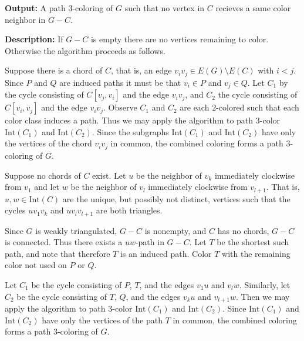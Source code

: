 \documentclass[letterpaper, 12pt]{amsart}
\theoremstyle{definition}
\theoremstyle{definition}
\theoremstyle{thm}
\theoremstyle{definition}
\begin{document}
\noindent\textbf{Output:} A path $3$-coloring of $G$ such that no vertex in
$C$ recieves a same color neighbor in $G-C$.

\noindent\textbf{Description:} If $G-C$ is empty there are no vertices remaining
to color. Otherwise the algorithm proceeds as follows.

Suppose there is a chord of $C$, that is, an edge $v_iv_j\in E(G)\setminus E(C)$
with $i<j$. Since $P$ and $Q$ are induced paths it must be that $v_i\in P$ and
$v_j\in Q$. Let $C_1$ by the cycle consisting of $C[v_j,v_i]$ and the
edge $v_iv_j$, and $C_2$ the cycle consisting of $C[v_i,v_j]$ and the edge
$v_iv_j$. Observe $C_1$ and $C_2$ are each $2$-colored
such that each color class induces a path. Thus we may apply the algorithm to
path $3$-color $\text{Int}(C_1)$ and $\text{Int}(C_2)$. Since the subgraphs
$\text{Int}(C_1)$ and $\text{Int}(C_2)$ have only the vertices of the chord
$v_iv_j$ in common, the combined coloring forms a path $3$-coloring of $G$.

Suppose no chords of $C$ exist. Let $u$ be the neighbor of $v_k$ immediately
clockwise from $v_1$ and let $w$ be the neighbor of $v_l$ immediately clockwise
from $v_{l+1}$. That is, $u,w\in\text{Int}(C)$ are the unique, but possibly not
distinct, vertices such that
the cycles $uv_1v_k$ and $uv_lv_{l+1}$ are both triangles.

Since $G$ is weakly triangulated, $G-C$ is nonempty,
and $C$ has no chords, $G-C$ is connected. Thus there exists a $uw$-path in
$G-C$. Let $T$ be the shortest such path, and note that therefore $T$ is
an induced path. Color $T$ with the remaining color not used on $P$ or $Q$.

Let $C_1$ be the cycle
consisting of $P$, $T$, and the edges $v_1u$ and $v_lw$. Similarly, let $C_2$ be
the cycle consisting of $T$, $Q$, and the edges $v_ku$ and $v_{l+1}w$. Then we
may apply the algorithm to path $3$-color $\text{Int}(C_1)$ and
$\text{Int}(C_2)$. Since $\text{Int}(C_1)$ and $\text{Int}(C_2)$ have only the
vertices of the path $T$ in common, the combined coloring forms a path
$3$-coloring of $G$.\\
\end{document}
